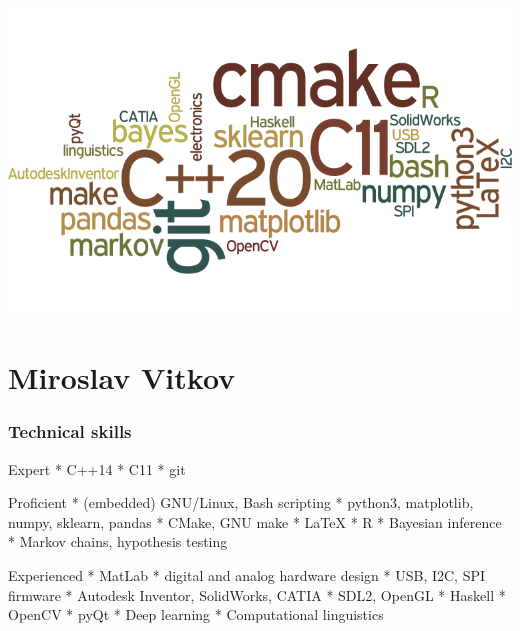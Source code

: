 \documentclass{tccv}
\begin{document}
\includegraphics[width=\textwidth]{wordcloud}


\part{Miroslav Vitkov}


\section{Technical skills}
\begin{factlist}
\item{Expert}
{
     * C++14 \mynext
     * C11   \mynext
     * git
}
\\
\item{Proficient}
{
    * (embedded) GNU/Linux, Bash scripting         \mynext
    * python3, matplotlib, numpy, sklearn, pandas  \mynext
    * CMake, GNU make                              \mynext
    * \LaTeX                                       \mynext
    * R                                            \mynext
    * Bayesian inference                           \mynext
    * Markov chains, hypothesis testing
}
\\
\item{Experienced}
{
    * MatLab                                       \mynext
    * digital and analog hardware design           \mynext
    * USB, I2C, SPI firmware                       \mynext
    * Autodesk Inventor, SolidWorks, CATIA         \mynext
    * SDL2, OpenGL                                 \mynext
    * Haskell                                      \mynext
    * OpenCV                                       \mynext
    * pyQt                                         \mynext
    * Deep learning                                \mynext
    * Computational linguistics
}
\end{factlist}
\end{document}
